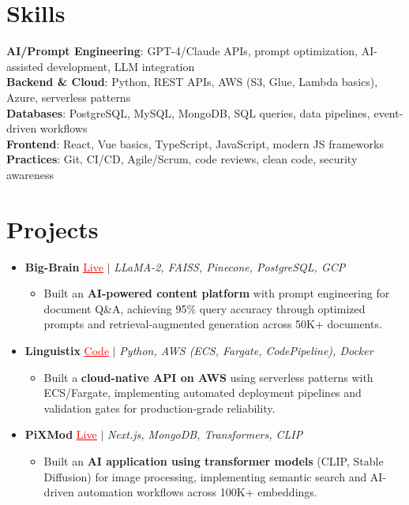 \documentclass[letterpaper,10pt]{article}
\newcommand{\resumeItem}[1]{\item\small{{#1 \vspace{-2pt}}}}
\newcommand{\resumeProjectHeading}[1]{\item \small #1 \vspace{-2pt}}
\newcommand{\resumeSubHeadingListStart}{\begin{itemize}[leftmargin=0.0in, label={}]}
\newcommand{\resumeSubHeadingListEnd}{\end{itemize}}
\newcommand{\resumeProjItemListStart}{\begin{itemize}[leftmargin=0.15in,label=\textbullet,itemsep=0pt,topsep=0pt,parsep=0pt,partopsep=0pt]}
\newcommand{\resumeProjItemListEnd}{\end{itemize}\vspace{-4pt}}
\begin{document}
\section{Skills}
\begin{itemize}[leftmargin=0.15in, label={}]
\small{\item{
\textbf{AI/Prompt Engineering}: GPT-4/Claude APIs, prompt optimization, AI-assisted development, LLM integration \\
\textbf{Backend \& Cloud}: Python, REST APIs, AWS (S3, Glue, Lambda basics), Azure, serverless patterns \\
\textbf{Databases}: PostgreSQL, MySQL, MongoDB, SQL queries, data pipelines, event-driven workflows \\
\textbf{Frontend}: React, Vue basics, TypeScript, JavaScript, modern JS frameworks \\
\textbf{Practices}: Git, CI/CD, Agile/Scrum, code reviews, clean code, security awareness
}}
\end{itemize}
\vspace{-16pt}
\section{Projects}
\resumeSubHeadingListStart
\vspace{-2pt}
\resumeProjectHeading{\textbf{Big-Brain} {\href{https://big-brain-pied.vercel.app/}{\textcolor{red}{\underline{Live}}}} $|$ \emph{LLaMA-2, FAISS, Pinecone, PostgreSQL, GCP}}
\resumeProjItemListStart
\resumeItem{Built an \textbf{AI-powered content platform} with prompt engineering for document Q\&A, achieving 95\% query accuracy through optimized prompts and retrieval-augmented generation across 50K+ documents.}
\resumeProjItemListEnd
\vspace{3pt}
\resumeProjectHeading{\textbf{Linguistix} {\href{https://github.com/SAHAJ-BHADJA/Linguistix}{\textcolor{red}{\underline{Code}}}} $|$ \emph{Python, AWS (ECS, Fargate, CodePipeline), Docker}}
\resumeProjItemListStart
\resumeItem{Built a \textbf{cloud-native API on AWS} using serverless patterns with ECS/Fargate, implementing automated deployment pipelines and validation gates for production-grade reliability.}
\resumeProjItemListEnd
\vspace{3pt}
\resumeProjectHeading{\textbf{PiXMod} {\href{https://pixmod.vercel.app/}{\textcolor{red}{\underline{Live}}}} $|$ \emph{Next.js, MongoDB, Transformers, CLIP}}
\resumeProjItemListStart
\resumeItem{Built an \textbf{AI application using transformer models} (CLIP, Stable Diffusion) for image processing, implementing semantic search and AI-driven automation workflows across 100K+ embeddings.}
\resumeProjItemListEnd
\resumeSubHeadingListEnd
\end{document}
